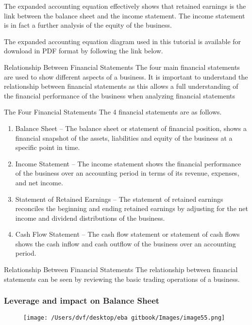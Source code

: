 \documentclass[]{book}
\theoremstyle{definition}
\theoremstyle{definition}
\theoremstyle{definition}
\theoremstyle{remark}
\begin{document}
The expanded accounting equation effectively shows that retained
earnings is the link between the balance sheet and the income statement.
The income statement is in fact a further analysis of the equity of the
business.

The expanded accounting equation diagram used in this tutorial is
available for download in PDF format by following the link below.

Relationship Between Financial Statements The four main financial
statements are used to show different aspects of a business. It is
important to understand the relationship between financial statements as
this allows a full understanding of the financial performance of the
business when analyzing financial statements

The Four Financial Statements The 4 financial statements are as follows.

\begin{enumerate}
\def\labelenumi{\arabic{enumi}.}
\item
  Balance Sheet -- The balance sheet or statement of financial position,
  shows a financial snapshot of the assets, liabilities and equity of
  the business at a specific point in time.
\item
  Income Statement -- The income statement shows the financial
  performance of the business over an accounting period in terms of its
  revenue, expenses, and net income.
\item
  Statement of Retained Earnings -- The statement of retained earnings
  reconciles the beginning and ending retained earnings by adjusting for
  the net income and dividend distributions of the business.
\item
  Cash Flow Statement -- The cash flow statement or statement of cash
  flows shows the cash inflow and cash outflow of the business over an
  accounting period.
\end{enumerate}

Relationship Between Financial Statements The relationship between
financial statements can be seen by reviewing the basic trading
operations of a business.

\subsubsection{Leverage and impact on Balance
Sheet}\label{leverage-and-impact-on-balance-sheet}

\begin{figure}[htbp]
\centering
\texttt{[image: /Users/dvf/desktop/eba gitbook/Images/image55.png]}
\caption{}
\end{figure}
\end{document}
